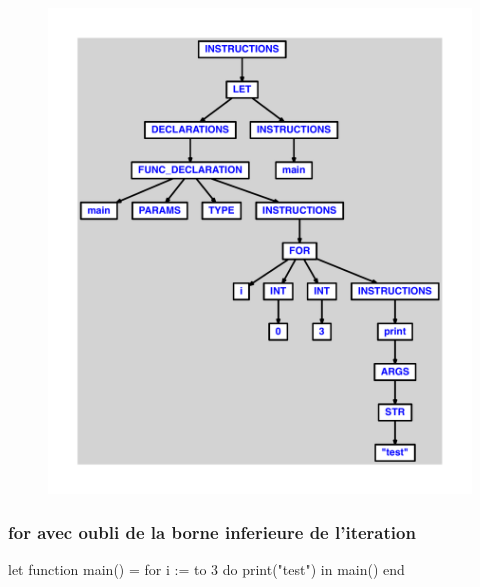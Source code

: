 \documentclass{article}
\begin{document}
\begin{figure}[H]\centering\includegraphics[max width=\textwidth]{ast/ast_191.pdf}\end{figure}\subsubsection{for avec oubli de la borne inferieure de l'iteration}
\begin{verbatimtab}
let
	function main() =
		for i := to 3 do
			print("test")
in main() end
\end{verbatimtab}
\end{document}

